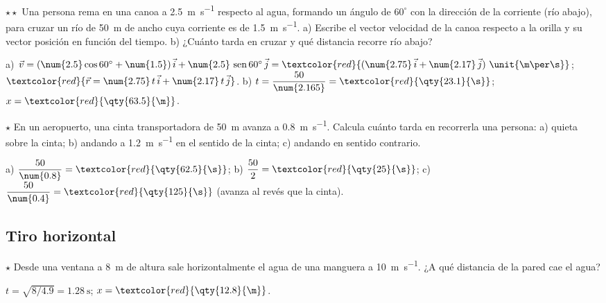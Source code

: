 \begin{exercise}
    \(\star\star\) Una persona rema en una canoa a \qty{2.5}{\m\per\s} respecto al agua, formando un ángulo de \(60^\circ\) con la
    dirección de la corriente (río abajo), para cruzar un río de \qty{50}{\m} de ancho cuya corriente es de \qty{1.5}{\m\per\s}.
    a) Escribe el vector velocidad de la canoa respecto a la orilla y su vector posición en función del tiempo. b) ¿Cuánto tarda en
    cruzar y qué distancia recorre río abajo?
    \begin{solu}
        a) \(\vec v = (\num{2.5}\cos 60^\circ + \num{1.5})\,\ivec + \num{2.5}\,\sen 60^\circ\,\jvec =
        \textcolor{red}{(\num{2.75}\,\ivec + \num{2.17}\,\jvec)~\unit{\m\per\s}}\); \(\textcolor{red}{\vec r = \num{2.75}\,t\,\ivec +
        \num{2.17}\,t\,\jvec}\). b) \(t = \dfrac{50}{\num{2.165}} = \textcolor{red}{\qty{23.1}{\s}}\); \(x = \textcolor{red}{\qty{63.5}{\m}}\).
    \end{solu}
\end{exercise}

\begin{exercise}
    \(\star\) En un aeropuerto, una cinta transportadora de \qty{50}{\m} avanza a \qty{0.8}{\m\per\s}. Calcula cuánto tarda en
    recorrerla una persona: a) quieta sobre la cinta; b) andando a \qty{1.2}{\m\per\s} en el sentido de la cinta; c) andando en sentido
    contrario.
    \begin{solu}
        a) \(\dfrac{50}{\num{0.8}} = \textcolor{red}{\qty{62.5}{\s}}\); b) \(\dfrac{50}{2} = \textcolor{red}{\qty{25}{\s}}\);
        c) \(\dfrac{50}{\num{0.4}} = \textcolor{red}{\qty{125}{\s}}\) (avanza al revés que la cinta).
    \end{solu}
\end{exercise}

\subsection{Tiro horizontal}

\begin{exercise}
    \(\star\) Desde una ventana a \qty{8}{\m} de altura sale horizontalmente el agua de una manguera a \qty{10}{\m\per\s}. ¿A qué
    distancia de la pared cae el agua?
    \begin{solu}
        \(t = \sqrt{8/\num{4.9}} = \qty{1.28}{\s}\); \(x = \textcolor{red}{\qty{12.8}{\m}}\).
    \end{solu}
\end{exercise}

